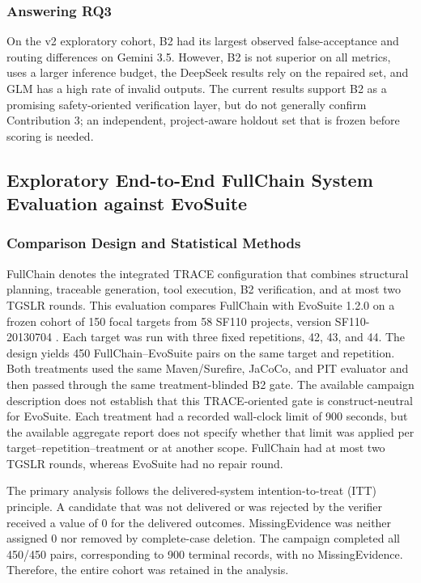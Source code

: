\documentclass[pdflatex,sn-basic,Numbered,iicol]{sn-jnl}
\begin{document}
\subsubsection{Answering RQ3}\label{subsubsec:rq3-answer}

On the v2 exploratory cohort, B2 had its largest observed false-acceptance and routing differences on Gemini 3.5. However, B2 is not superior on all metrics, uses a larger inference budget, the DeepSeek results rely on the repaired set, and GLM has a high rate of invalid outputs. The current results support B2 as a promising safety-oriented verification layer, but do not generally confirm Contribution 3; an independent, project-aware holdout set that is frozen before scoring is needed.

\subsection{Exploratory End-to-End FullChain System Evaluation against EvoSuite}\label{subsec:fullchain-evosuite}

\subsubsection{Comparison Design and Statistical Methods}\label{subsubsec:fullchain-design}

FullChain denotes the integrated TRACE configuration that combines structural planning, traceable generation, tool execution, B2 verification, and at most two TGSLR rounds. This evaluation compares FullChain with EvoSuite 1.2.0 \cite{bib1} on a frozen cohort of 150 focal targets from 58 SF110 projects, version SF110-20130704 \cite{bib37}. Each target was run with three fixed repetitions, 42, 43, and 44. The design yields 450 FullChain--EvoSuite pairs on the same target and repetition. Both treatments used the same Maven/Surefire, JaCoCo, and PIT evaluator and then passed through the same treatment-blinded B2 gate. The available campaign description does not establish that this TRACE-oriented gate is construct-neutral for EvoSuite. Each treatment had a recorded wall-clock limit of 900 seconds, but the available aggregate report does not specify whether that limit was applied per target--repetition--treatment or at another scope. FullChain had at most two TGSLR rounds, whereas EvoSuite had no repair round.

The primary analysis follows the delivered-system intention-to-treat (ITT) principle. A candidate that was not delivered or was rejected by the verifier received a value of 0 for the delivered outcomes. MissingEvidence was neither assigned 0 nor removed by complete-case deletion. The campaign completed all 450/450 pairs, corresponding to 900 terminal records, with no MissingEvidence. Therefore, the entire cohort was retained in the analysis.
\end{document}
